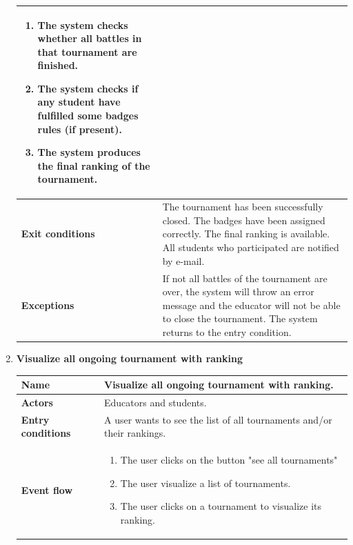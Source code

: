 \begin{enumerate}[label=\textbf{UC.\arabic*}]
\begin{table}[H]
\begin{tabular}{|m{3.2cm}|m{9.8cm}|}
\begin{enumerate}[label=\arabic*.]
                        \item The system checks whether all battles in that tournament are finished.
                        \item The system checks if any student have fulfilled some badges rules (if present).
                        \item The system produces the final ranking of the tournament.
                    \end{enumerate}\\
                    \hline
                    \textbf{Exit conditions}  & The tournament has been successfully closed. The badges have been assigned correctly. The final ranking is available. All students who participated are notified by e-mail. \\
                    \hline
                    \textbf{Exceptions}  & If not all battles of the tournament are over, the system will throw an error message and the educator will not be able to close the tournament. The system returns to the entry condition.\\
                    \hline 
                \end{tabular}
        \end{table}
        \item {} \textbf{Visualize all ongoing tournament with ranking}
        \begin{table}[H]
    	    \centering
                \renewcommand{\arraystretch}{1.5}
                \begin{tabular}{|m{3.2cm}|m{9.8cm}|}
                    \hline
                    \textbf{Name} & Visualize all ongoing tournament with ranking.  \\
                    \hline
                    \textbf{Actors} & Educators and students. \\
                    \hline
                    \textbf{Entry conditions}  & A user wants to see the list of all tournaments and/or their rankings. \\
                    \hline
                    \textbf{Event flow}  & 
                    \begin{enumerate}[label=\arabic*.]
                        \item The user clicks on the button "see all tournaments"
                        \item The user visualize a list of tournaments.
                        \item The user clicks on a tournament to visualize its ranking.

\end{enumerate}
\end{tabular}
\end{table}
\end{enumerate}
